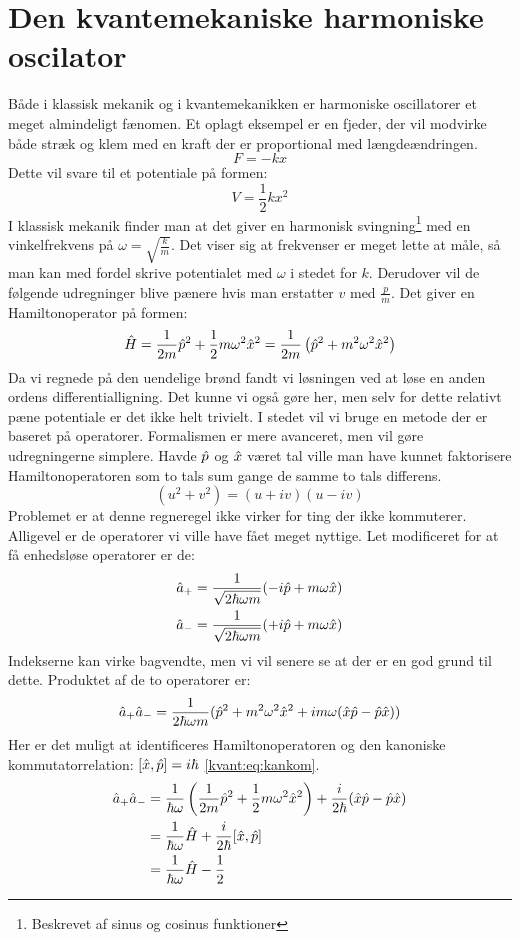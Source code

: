 \documentclass[../Kvantemekanik.tex]{subfiles}
\begin{document}
\section{Den kvantemekaniske harmoniske oscilator}
Både i klassisk mekanik og i kvantemekanikken er harmoniske oscillatorer et meget almindeligt fænomen.
Et oplagt eksempel er en fjeder, der vil modvirke både stræk og klem med en kraft der er proportional med længdeændringen.
$$
F = -kx
$$
Dette vil svare til et potentiale på formen:
$$
V=\frac{1}{2}kx^2
$$
I klassisk mekanik finder man at det giver en harmonisk svingning\footnote{Beskrevet af sinus og cosinus funktioner} med en vinkelfrekvens på $\omega = \sqrt{\frac{k}{m}}$. Det viser sig at frekvenser er meget lette at måle, så man kan med fordel skrive potentialet med $\omega$ i stedet for $k$. Derudover vil de følgende udregninger blive pænere hvis man erstatter $v$ med $\frac{p}{m}$. Det giver en Hamiltonoperator på formen:
\begin{equation}
\hat H = \frac{1}{2m}\hat p^2+\frac{1}{2} m\omega^2\hat x^2
=
\frac{1}{2m}\left(\hat p^2 + m^2\omega^2\hat x^2\right)
\end{equation}
Da vi regnede på den uendelige brønd fandt vi løsningen ved at løse en anden ordens differentialligning. Det kunne vi også gøre her, men selv for dette relativt pæne potentiale er det ikke helt trivielt. I stedet vil vi bruge en metode der er baseret på operatorer. Formalismen er mere avanceret, men vil gøre udregningerne simplere.
Havde $\hat p$ og $\hat x$ været tal ville man have kunnet faktorisere Hamiltonoperatoren som to tals sum gange de samme to tals differens.
$$
(u^2+v^2) = (u+iv)(u-iv)
$$
Problemet er at denne regneregel ikke virker for ting der ikke kommuterer.
Alligevel er de operatorer vi ville have fået meget nyttige. Let modificeret for at få enhedsløse operatorer er de:
\begin{align}
\hat a_+ &= \frac{1}{\sqrt{2\hbar \omega m}}(-i\hat p+m\omega \hat x)\label{kvant:eq:ahigher}\\
\hat a_- &= \frac{1}{\sqrt{2\hbar \omega m}}(+i\hat p+m\omega \hat x)\label{kvant:eq:alower}
\end{align}
Indekserne kan virke bagvendte, men vi vil senere se at der er en god grund til dette.
Produktet af de to operatorer er:
$$
\hat a_+ \hat a_- = \frac{1}{2\hbar \omega m}(\hat p^2+m^2\omega^2\hat x^2+im\omega (\hat x\hat p -  \hat p \hat x))
$$
Her er det muligt at identificeres Hamiltonoperatoren og den kanoniske kommutatorrelation: $[\hat x , \hat p] = i\hbar$ \eqref{kvant:eq:kankom}.
\begin{align*}
\hat a_+\hat a_- &= \frac{1}{\hbar \omega}\left( \frac{1}{2m}\hat p^2+\frac{1}{2}m\omega^2 \hat x^2\right)+\frac{i}{2\hbar}(\hat x\hat p-\hat p\hat x)\\
&= \frac{1}{\hbar \omega}\hat H+\frac{i}{2 \hbar}[\hat x,\hat p]\\
&= \frac{1}{\hbar \omega}\hat H-\frac{1}{2}
\end{align*}
\end{document}
